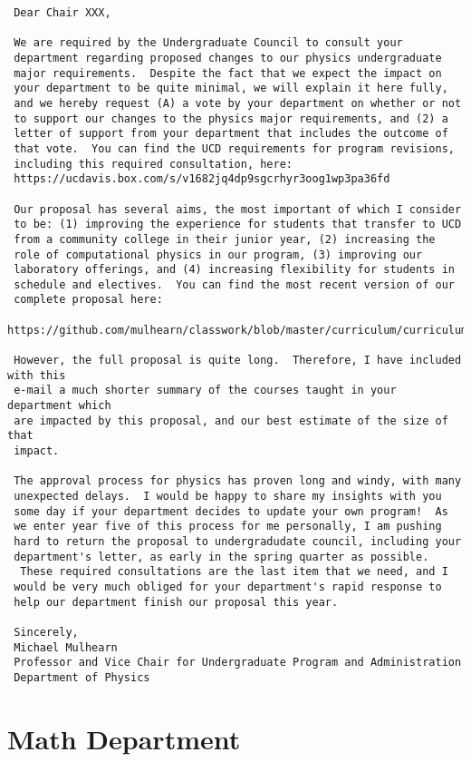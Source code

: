 \documentclass[12pt]{article}
\begin{document}
\begin{verbatim}
 Dear Chair XXX,

 We are required by the Undergraduate Council to consult your
 department regarding proposed changes to our physics undergraduate
 major requirements.  Despite the fact that we expect the impact on
 your department to be quite minimal, we will explain it here fully,
 and we hereby request (A) a vote by your department on whether or not
 to support our changes to the physics major requirements, and (2) a
 letter of support from your department that includes the outcome of
 that vote.  You can find the UCD requirements for program revisions,
 including this required consultation, here:
 https://ucdavis.box.com/s/v1682jq4dp9sgcrhyr3oog1wp3pa36fd

 Our proposal has several aims, the most important of which I consider
 to be: (1) improving the experience for students that transfer to UCD
 from a community college in their junior year, (2) increasing the
 role of computational physics in our program, (3) improving our
 laboratory offerings, and (4) increasing flexibility for students in
 schedule and electives.  You can find the most recent version of our
 complete proposal here:
 https://github.com/mulhearn/classwork/blob/master/curriculum/curriculum.pdf

 However, the full proposal is quite long.  Therefore, I have included with this
 e-mail a much shorter summary of the courses taught in your department which
 are impacted by this proposal, and our best estimate of the size of that
 impact.

 The approval process for physics has proven long and windy, with many
 unexpected delays.  I would be happy to share my insights with you
 some day if your department decides to update your own program!  As
 we enter year five of this process for me personally, I am pushing
 hard to return the proposal to undergradudate council, including your
 department's letter, as early in the spring quarter as possible.
  These required consultations are the last item that we need, and I
 would be very much obliged for your department's rapid response to
 help our department finish our proposal this year.

 Sincerely,
 Michael Mulhearn
 Professor and Vice Chair for Undergraduate Program and Administration
 Department of Physics
\end{verbatim}



\section{Math Department}
\end{document}
